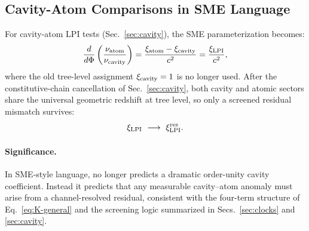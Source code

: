 \begin{table}[h]
\centering
\caption{SME bounds reinterpreted in \DFD framework.}
\label{tab:sme-bounds}
\end{table}

\subsection{Cavity-Atom Comparisons in SME Language}\label{app:sme-cavity}

For cavity-atom LPI tests (Sec.~\ref{sec:cavity}), the SME parameterization becomes:
\begin{equation}
\frac{d}{d\Phi}\left(\frac{\nu_{\rm atom}}{\nu_{\rm cavity}}\right) = \frac{\xi_{\rm atom} - \xi_{\rm cavity}}{c^2} = \frac{\xi_{\rm LPI}}{c^2},
\end{equation}
where the old tree-level assignment $\xi_{\rm cavity}=1$ is no longer used. After the constitutive-chain cancellation of Sec.~\ref{sec:cavity}, both cavity and atomic sectors share the universal geometric redshift at tree level, so only a screened residual mismatch survives:
\begin{equation}
\xi_{\rm LPI}\ \longrightarrow\ \xi_{\rm LPI}^{\rm res}.
\end{equation}

\paragraph{Significance.}
In SME-style language, \DFD no longer predicts a dramatic order-unity cavity coefficient. Instead it predicts that any measurable cavity--atom anomaly must arise from a channel-resolved residual, consistent with the four-term structure of Eq.~\eqref{eq:K-general} and the screening logic summarized in Secs.~\ref{sec:clocks} and \ref{sec:cavity}.
